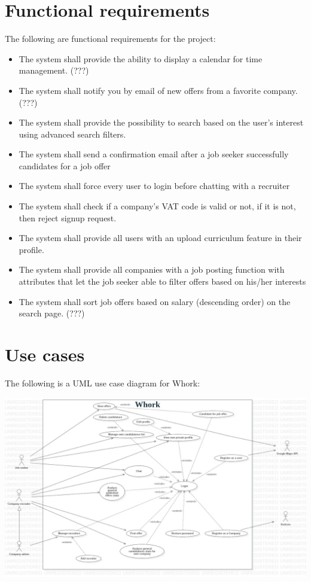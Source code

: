 \documentclass[12pt, a4paper]{article}
\begin{document}
\section{Functional requirements}
The following are functional requirements for the project:
\begin{itemize}
	\item The system shall provide the ability to display a calendar for time management. (???)
	\item The system shall notify you by email of new offers from a favorite company. (???)
	\item The system shall provide the possibility to search based on the user's interest using advanced search filters.
	\item The system shall send a confirmation email after a job seeker successfully candidates for a job offer
	\item The system shall force every user to login before chatting with a recruiter
	\item The system shall check if a company's VAT code is valid or not, if it is not, then reject signup request.
	\item The system shall provide all users with an upload curriculum feature in their profile.
	\item The system shall provide all companies with a job posting function with attributes that let the job seeker 
	able to filter offers based on his/her interests
	\item The system shall sort job offers based on salary (descending order) on the search page. (???)
\end{itemize}

\newpage
\section{Use cases}
The following is a UML use case diagram for Whork:

\begin{center}
	\includegraphics[scale=1.7]{diagrams/project/usecase/usecase_scaled.jpg}
\end{center}
\end{document}
